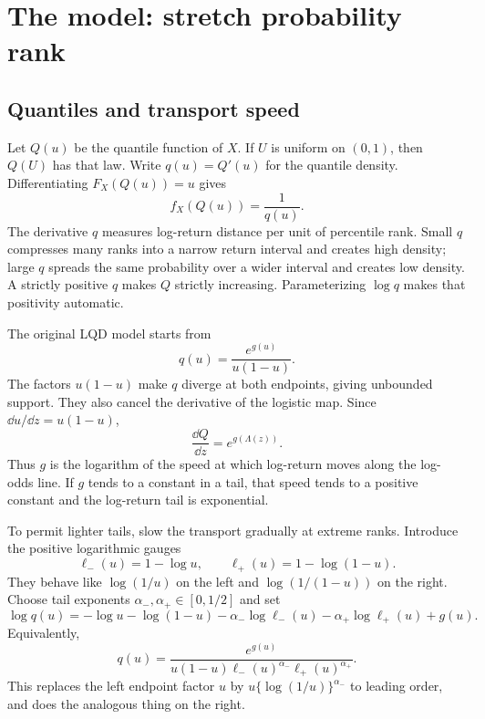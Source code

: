 \section{The model: stretch probability rank}
\label{sec:model}

\subsection{Quantiles and transport speed}

Let $Q(u)$ be the quantile function of $X$.  If $U$ is uniform on $(0,1)$,
then $Q(U)$ has that law.  Write $q(u)=Q'(u)$ for the quantile density.
Differentiating $F_X(Q(u))=u$ gives
\begin{equation}
f_X(Q(u))=\frac1{q(u)}.
\label{eq:reciprocal}
\end{equation}
The derivative $q$ measures log-return distance per unit of percentile rank.
Small $q$ compresses many ranks into a narrow return interval and creates
high density; large $q$ spreads the same probability over a wider interval
and creates low density.  A strictly positive $q$ makes $Q$ strictly
increasing.  Parameterizing $\log q$ makes that positivity automatic.

The original LQD model starts from
\begin{equation}
q(u)=\frac{e^{g(u)}}{u(1-u)}.
\label{eq:originalskeleton}
\end{equation}
The factors $u(1-u)$ make $q$ diverge at both endpoints, giving unbounded
support.  They also cancel the derivative of the logistic map.  Since
$\dd u/\dd z=u(1-u)$,
\begin{equation}
\frac{\dd Q}{\dd z}=e^{g(\Lambda(z))}.
\label{eq:originalspeed}
\end{equation}
Thus $g$ is the logarithm of the speed at which log-return moves along the
log-odds line.  If $g$ tends to a constant in a tail, that speed tends to a
positive constant and the log-return tail is exponential.

To permit lighter tails, slow the transport gradually at extreme ranks.
Introduce the positive logarithmic gauges
\begin{equation}
\ell_-(u)=1-\log u,
\qquad
\ell_+(u)=1-\log(1-u).
\label{eq:ellgauges}
\end{equation}
They behave like $\log(1/u)$ on the left and
$\log(1/(1-u))$ on the right.  Choose tail exponents
$\alpha_-,\alpha_+\in[0,1/2]$ and set
\begin{equation}
\log q(u)=
-\log u-\log(1-u)
-\alpha_-\log\ell_-(u)-\alpha_+\log\ell_+(u)+g(u).
\label{eq:skeleton}
\end{equation}
Equivalently,
\begin{equation}
q(u)=\frac{e^{g(u)}}
{u(1-u)\ell_-(u)^{\alpha_-}\ell_+(u)^{\alpha_+}}.
\label{eq:lqdform}
\end{equation}
This replaces the left endpoint factor $u$ by
$u\{\log(1/u)\}^{\alpha_-}$ to leading order, and does the analogous thing
on the right.


